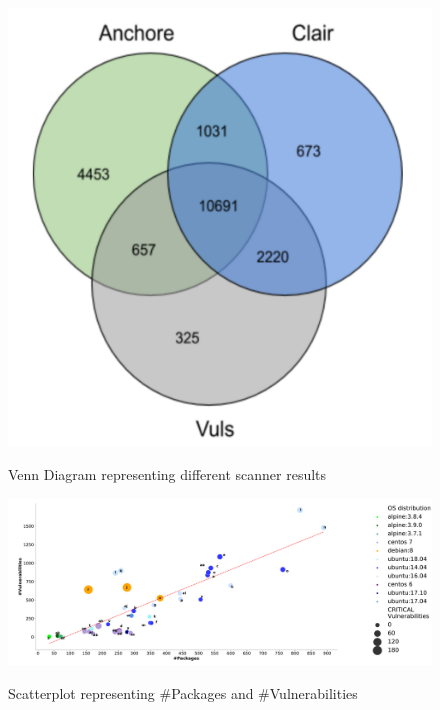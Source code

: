 \documentclass[a4paper,num-refs]{oup-contemporary}
\begin{document}
\begin{figure}[H]
        {\includegraphics[scale=2.5,width=\columnwidth]
        {Figures/vennDiagram.pdf}}
        \caption{\label{fig:venn} Venn Diagram representing different scanner results}
\end{figure}

\begin{figure}
	{\includegraphics[scale=1.5,width=\textwidth]
	{Figures/vulngraph.pdf}}
        \caption{\label{fig:graph1} Scatterplot representing \#Packages and \#Vulnerabilities}
      \end{figure}
\end{document}
